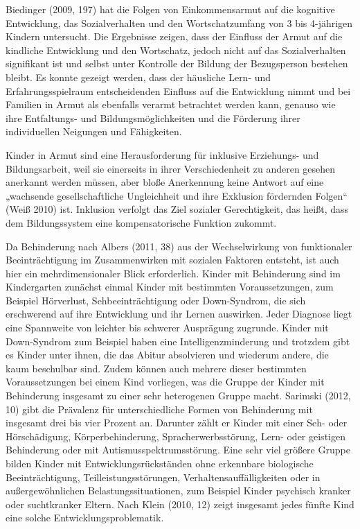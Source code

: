 Biedinger (2009, 197) hat die Folgen von Einkommensarmut auf die kognitive Entwicklung, das Sozialverhalten und den Wortschatzumfang von 3 bis 4-jährigen Kindern untersucht. Die Ergebnisse zeigen, dass der Einfluss der Armut auf die kindliche Entwicklung und den Wortschatz, jedoch nicht auf das Sozialverhalten signifikant ist und selbst unter Kontrolle der Bildung der Bezugsperson bestehen bleibt. Es konnte gezeigt werden, dass der häusliche Lern- und Erfahrungsspielraum entscheidenden Einfluss auf die Entwicklung nimmt und bei Familien in Armut als ebenfalls verarmt betrachtet werden kann, genauso wie ihre Entfaltungs- und Bildungsmöglichkeiten und die Förderung ihrer individuellen Neigungen und Fähigkeiten.

Kinder in Armut sind eine Herausforderung für inklusive Erziehungs- und Bildungsarbeit, weil sie einerseits in ihrer Verschiedenheit zu anderen gesehen anerkannt werden müssen, aber bloße Anerkennung keine Antwort auf eine „wachsende gesellschaftliche Ungleichheit und ihre Exklusion fördernden Folgen“ (Weiß 2010) ist. Inklusion verfolgt das Ziel sozialer Gerechtigkeit, das heißt, dass dem Bildungssystem eine kompensatorische Funktion zukommt.       
 
Da Behinderung nach Albers (2011, 38) aus der Wechselwirkung von funktionaler Beeinträchtigung im Zusammenwirken mit sozialen Faktoren entsteht, ist auch hier ein mehrdimensionaler Blick erforderlich. Kinder mit Behinderung sind im Kindergarten zunächst einmal Kinder mit bestimmten Voraussetzungen, zum Beispiel Hörverlust, Sehbeeinträchtigung oder Down-Syndrom, die sich erschwerend auf ihre Entwicklung und ihr Lernen auswirken. Jeder Diagnose liegt eine Spannweite von leichter bis schwerer Ausprägung zugrunde. Kinder mit Down-Syndrom zum Beispiel haben eine Intelligenzminderung und trotzdem gibt es Kinder unter ihnen, die das Abitur absolvieren und wiederum andere, die kaum beschulbar sind. Zudem können auch mehrere dieser bestimmten Voraussetzungen bei einem Kind vorliegen, was die Gruppe der Kinder mit Behinderung insgesamt zu einer sehr heterogenen Gruppe macht. Sarimski (2012, 10) gibt die Prävalenz für unterschiedliche Formen von Behinderung mit insgesamt drei bis vier Prozent an. Darunter zählt er Kinder mit einer Seh- oder Hörschädigung, Körperbehinderung, Spracherwerbsstörung, Lern- oder geistigen Behinderung oder mit Autismusspektrumsstörung. 
Eine sehr viel größere Gruppe bilden Kinder mit Entwicklungsrückständen ohne erkennbare biologische Beeinträchtigung, Teilleistungsstörungen, Verhaltensauffälligkeiten oder in außergewöhnlichen Belastungssituationen, zum Beispiel Kinder psychisch kranker oder suchtkranker Eltern. Nach Klein (2010, 12) zeigt insgesamt jedes fünfte Kind eine solche Entwicklungsproblematik. 

